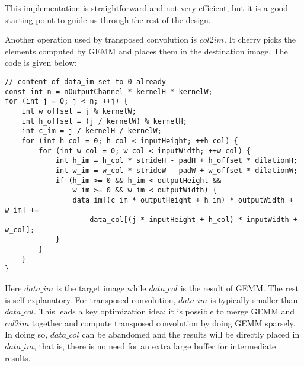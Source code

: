 This implementation is straightforward and not very efficient, but it is a good starting point to guide
us through the rest of the design.

Another operation used by transposed convolution is $col2im$. It cherry picks the elements computed by GEMM
and places them in the destination image. The code is given below:

\begin{code}
\begin{verbatim}
// content of data_im set to 0 already
const int n = nOutputChannel * kernelH * kernelW;
for (int j = 0; j < n; ++j) {
    int w_offset = j % kernelW;
    int h_offset = (j / kernelW) % kernelH;
    int c_im = j / kernelH / kernelW;
    for (int h_col = 0; h_col < inputHeight; ++h_col) {
        for (int w_col = 0; w_col < inputWidth; ++w_col) {
            int h_im = h_col * strideH - padH + h_offset * dilationH;
            int w_im = w_col * strideW - padW + w_offset * dilationW;
            if (h_im >= 0 && h_im < outputHeight &&
                w_im >= 0 && w_im < outputWidth) {
                data_im[(c_im * outputHeight + h_im) * outputWidth + w_im] +=
                    data_col[(j * inputHeight + h_col) * inputWidth + w_col];
            }
        }
    }
}
\end{verbatim}
\label{code:col2im}
\end{code}

Here $data\_im$ is the target image while $data\_col$ is the result of GEMM. The rest is self-explanatory.
For transposed convolution, $data\_im$ is typically smaller than $data\_col$. This leads a key optimization
idea: it is possible to merge GEMM and $col2im$ together and compute transposed convolution by doing GEMM
sparsely. In doing so, $data\_col$ can be abandomed and the results will be directly placed in $data\_im$,
that is, there is no need for an extra large buffer for intermediate results.

